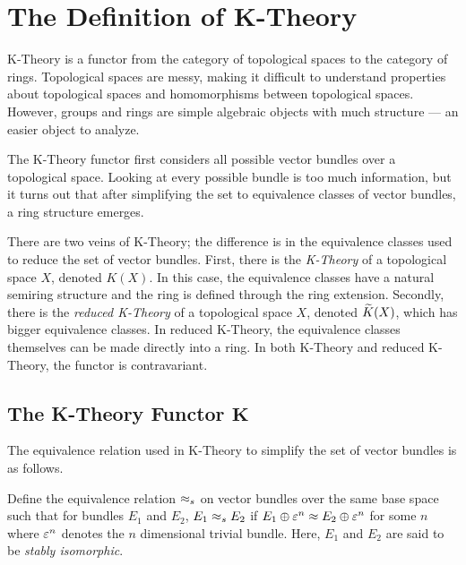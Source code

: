 \documentclass[../sean_thesis.tex]{subfiles}
\begin{document}
\chapter{The Definition of K-Theory}

K-Theory is a functor from the category of topological spaces to the category of rings. Topological spaces are messy, making it difficult to understand properties about topological spaces and homomorphisms between topological spaces. However, groups and rings are simple algebraic objects with much structure --- an easier object to analyze. 

The K-Theory functor first considers all possible vector bundles over a topological space. Looking at every possible bundle is too much information, but it turns out that after simplifying the set to equivalence classes of vector bundles, a ring structure emerges.

There are two veins of K-Theory; the difference is in the equivalence classes used to reduce the set of vector bundles. First, there is the \emph{K-Theory} of a topological space $X$, denoted $K(X)$. In this case, the equivalence classes have a natural semiring structure and the ring is defined through the ring extension. Secondly, there is the \emph{reduced K-Theory} of a topological space $X$, denoted $\widetilde{K}(X)$, which has bigger equivalence classes. In reduced K-Theory, the equivalence classes themselves can be made directly into a ring. In both K-Theory and reduced K-Theory, the functor is contravariant.
    
\section{The K-Theory Functor $\mathbf{K}$}



The equivalence relation used in K-Theory to simplify the set of  vector bundles is as follows.

\begin{definition}
	Define the equivalence relation $\approx_s$ on vector bundles over the same base space such that for bundles $E_1$ and $E_2$, $E_1 \approx_s E_2$ if $E_1 \oplus \varepsilon^{n} \approx E_2 \oplus \varepsilon^{n}$ for some $n$ where $\varepsilon^{n}$ denotes the $n$ dimensional trivial bundle. Here, $E_1$ and $E_2$ are said to be \emph{stably isomorphic}.
\end{definition}
\end{document}

